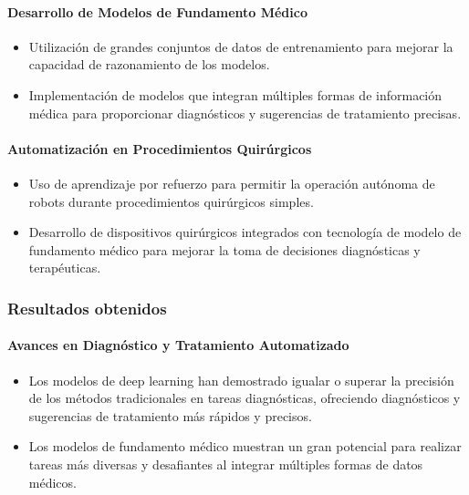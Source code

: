\paragraph{Desarrollo de Modelos de Fundamento Médico}

\begin{itemize}
    \item Utilización de grandes conjuntos de datos de entrenamiento para mejorar la capacidad de razonamiento de los modelos.
    \item Implementación de modelos que integran múltiples formas de información médica para proporcionar diagnósticos y sugerencias de tratamiento precisas.
\end{itemize}

\paragraph{Automatización en Procedimientos Quirúrgicos}

\begin{itemize}
    \item Uso de aprendizaje por refuerzo para permitir la operación autónoma de robots durante procedimientos quirúrgicos simples.
    \item Desarrollo de dispositivos quirúrgicos integrados con tecnología de modelo de fundamento médico para mejorar la toma de decisiones diagnósticas y terapéuticas.
\end{itemize}

\subsubsection{Resultados obtenidos}

\paragraph{Avances en Diagnóstico y Tratamiento Automatizado}

\begin{itemize}
    \item Los modelos de deep learning han demostrado igualar o superar la precisión de los métodos tradicionales en tareas diagnósticas, ofreciendo diagnósticos y sugerencias de tratamiento más rápidos y precisos.
    \item Los modelos de fundamento médico muestran un gran potencial para realizar tareas más diversas y desafiantes al integrar múltiples formas de datos médicos.
\end{itemize}

